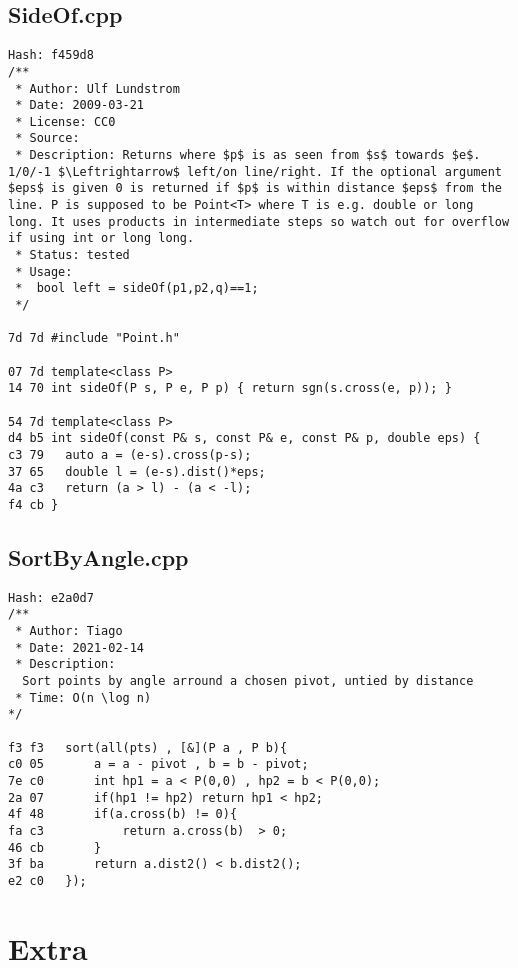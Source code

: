 \documentclass[11pt, a4paper, twoside]{article}
\begin{document}
\subsection{SideOf.cpp}
\begin{lstlisting}
Hash: f459d8
/**
 * Author: Ulf Lundstrom
 * Date: 2009-03-21
 * License: CC0
 * Source:
 * Description: Returns where $p$ is as seen from $s$ towards $e$. 1/0/-1 $\Leftrightarrow$ left/on line/right. If the optional argument $eps$ is given 0 is returned if $p$ is within distance $eps$ from the line. P is supposed to be Point<T> where T is e.g. double or long long. It uses products in intermediate steps so watch out for overflow if using int or long long.
 * Status: tested
 * Usage:
 * 	bool left = sideOf(p1,p2,q)==1;
 */

7d 7d #include "Point.h"

07 7d template<class P>
14 70 int sideOf(P s, P e, P p) { return sgn(s.cross(e, p)); }

54 7d template<class P>
d4 b5 int sideOf(const P& s, const P& e, const P& p, double eps) {
c3 79 	auto a = (e-s).cross(p-s);
37 65 	double l = (e-s).dist()*eps;
4a c3 	return (a > l) - (a < -l);
f4 cb }
\end{lstlisting}

\subsection{SortByAngle.cpp}
\begin{lstlisting}
Hash: e2a0d7
/**
 * Author: Tiago
 * Date: 2021-02-14
 * Description:
  Sort points by angle arround a chosen pivot, untied by distance
 * Time: O(n \log n)
*/

f3 f3 	sort(all(pts) , [&](P a , P b){
c0 05 		a = a - pivot , b = b - pivot;
7e c0 		int hp1 = a < P(0,0) , hp2 = b < P(0,0);
2a 07 		if(hp1 != hp2) return hp1 < hp2;
4f 48 		if(a.cross(b) != 0){
fa c3 			return a.cross(b)  > 0;
46 cb 		}
3f ba 		return a.dist2() < b.dist2();
e2 c0 	});
\end{lstlisting}

\pagebreak


%
%

\section{Extra}
\end{document}
